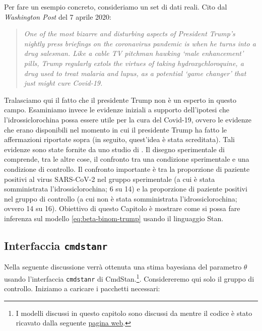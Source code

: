 \documentclass[
  10pt,
  italian,
  a4paper,
  extrafontsizes,onecolumn,openright
  ]{memoir}
\newlength{\rf}
\begin{document}
Per fare un esempio concreto, consideriamo un set di dati reali. Cito dal \emph{Washington Post} del 7 aprile 2020:

\begin{quote}
\emph{One of the most bizarre and disturbing aspects of President Trump's nightly press briefings on the coronavirus pandemic is when he turns into a drug salesman. Like a cable TV pitchman hawking `male enhancement' pills, Trump regularly extols the virtues of taking hydroxychloroquine, a drug used to treat malaria and lupus, as a potential `game changer' that just might cure Covid-19.}
\end{quote}

Tralasciamo qui il fatto che il presidente Trump non è un esperto in questo campo. Esaminiamo invece le evidenze iniziali a supporto dell'ipotesi che l'idrossiclorochina possa essere utile per la cura del Covid-19, ovvero le evidenze che erano disponibili nel momento in cui il presidente Trump ha fatto le affermazioni riportate sopra (in seguito, quest'idea è stata screditata). Tali evidenze sono state fornite da uno studio di \textcite{Gautret_2020}.
Il disegno sperimentale di \textcite{Gautret_2020} comprende, tra le altre cose, il confronto tra una condizione sperimentale e una condizione di controllo. Il confronto importante è tra la proporzione di paziente positivi al virus SARS-CoV-2 nel gruppo sperimentale (a cui è stata somministrata l'idrossiclorochina; 6 su 14) e la proporzione di paziente positivi nel gruppo di controllo (a cui non è stata somministrata l'idrossiclorochina; ovvero 14 su 16). Obiettivo di questo Capitolo è mostrare come si possa fare inferenza sul modello \eqref{eq:beta-binom-trump} usando il linguaggio Stan.

\hypertarget{cmdstanr-gautret}{%
\subsection{\texorpdfstring{Interfaccia \texttt{cmdstanr}}{Interfaccia cmdstanr}}\label{cmdstanr-gautret}}

Nella seguente discussione verrà ottenuta una stima bayesiana del parametro \(\theta\) usando l'interfaccia \texttt{cmdstanr} di CmdStan.\footnote{I modelli discussi in questo capitolo sono discussi da \textcite{gelman1995bayesian} mentre il codice è stato ricavato dalla seguente \href{http://avehtari.github.io/BDA_R_demos/demos_rstan/rstan_demo.html}{pagina web}.}. Considereremo qui solo il gruppo di controllo. Iniziamo a caricare i pacchetti necessari:
\end{document}
